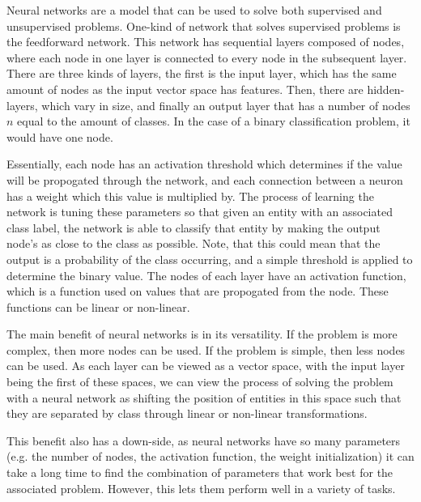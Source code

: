 Neural networks are a model that can be used to solve both supervised and unsupervised problems. One-kind of network that solves supervised problems is the feedforward network. This network has sequential layers composed of nodes, where each node in one layer is connected to every node in the subsequent layer. There are three kinds of layers, the first is the input layer, which has the same amount of nodes as the input vector space has features. Then, there are hidden-layers, which vary in size, and finally an output layer that has a number of nodes $n$ equal to the amount of classes. In the case of a binary classification problem, it would have one node.

Essentially, each node has an activation threshold which determines if the value will be propogated through the network, and each connection between a neuron has a weight which this value is multiplied by. The process of learning the network is tuning these parameters so that given an entity with an associated class label, the network is able to classify that entity by making the output node's as close to the class as possible. Note, that this could mean that the output is a probability of the class occurring, and a simple threshold is applied to determine the binary value. The nodes of each layer have an activation function, which is a function used on values that are propogated from the node. These functions can be linear or non-linear.

The main benefit of neural networks is in its versatility. If the problem is more complex, then more nodes can be used. If the problem is simple, then less nodes can be used. As each layer can be viewed as a vector space, with the input layer being the first of these spaces, we can view the process of solving the problem with a neural network as shifting the position of entities in this space such that they are separated by class through linear or non-linear transformations. 

This benefit also has a down-side, as neural networks have so many parameters (e.g. the number of nodes, the activation function, the weight initialization) it can take a long time to find the combination of parameters that work best for the associated problem. However, this lets them perform well in a variety of tasks. 


